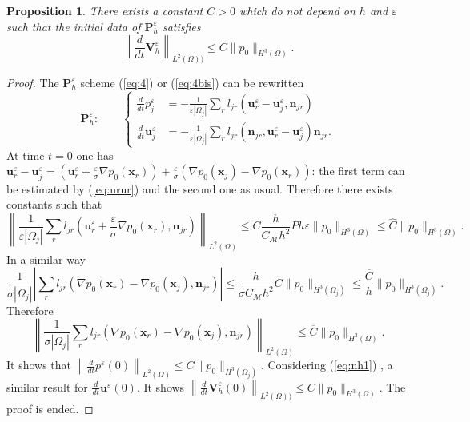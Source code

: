 \documentclass[a4paper,french,english,10pt]{article}
\newcommand\njr{\mathbf{n}_{jr}}
\newcommand\uu{\mathbf{u}}
\newcommand\eps{\varepsilon}
\newcommand\uj{\uu_j}
\newcommand\ur{\uu_r}
\newtheorem{proposition}[theorem]{Proposition}
\begin{document}
\begin{proposition}
There exists a constant $C>0$ which do not depend on $h$ and $\eps$ such that
the initial data of $\mathbf P_h^\eps$ satisfies
\begin{equation} \label{eq:nhnhnh1}
\left\|  \frac d{dt} \mathbf V_h^\eps \right\|_{L^2(\Omega))} 
 \leq C \|   p_0   \|_{H^3(\Omega)}.
\end{equation}
\end{proposition}
\begin{proof}
The $\mathbf P_h^\eps$ scheme (\ref{eq:4}) or (\ref{eq:4bis}) can be rewritten 
\begin{equation} \label{eq:nh1}
\mathbf P_h^\eps:
\qquad
\left\{ 
\begin{array}{ll}
\displaystyle
\frac{d}{dt} p_{j}^{\eps}&\displaystyle
 =  -\frac{1}{ \varepsilon |\Omega_{j} | }
\sum_{r}l_{jr}(\ur^{\eps}- \uj^\eps,\njr) \\
\displaystyle 
\frac{d}{dt}\uj^{\eps}& = - \frac{1}{\varepsilon  |
\Omega_{j}| }
\sum_{r}l_{jr} (\njr,\uu_r^{\eps} -\uu_j^{\eps})\njr.
\end{array}
\right.
\end{equation}
At time $t=0$ one has 
$
\ur^{\eps}- \uj^\eps= \left( \ur^{\eps} + \frac \eps \sigma \nabla p_0(\mathbf x_r) \right)
+ \frac\eps \sigma \left(   \nabla p_0(\mathbf x_j)- \nabla p_0(\mathbf x_r) \right)$:
the first term can be estimated by (\ref{eq:urur}) and the second one as usual.
Therefore there exists  constants such that
$$
\left\| \frac{1}{ \varepsilon |\Omega_{j} | }
\sum_{r}l_{jr}(\ur^{\eps} + \frac \eps \sigma \nabla p_0(\mathbf x_r)  ,\njr)  \right\|_{L^2(\Omega)}
\leq C \frac{h}{C_\mathcal M h^2}P h\eps \| p_0 \|_{H^3(\Omega)}\leq
\widehat C\| p_0 \|_{H^3(\Omega)}.
$$
In a similar way
$$
\frac{1}{ \sigma |\Omega_{j} | }
\left| 
\sum_{r}l_{jr}(   \nabla p_0(\mathbf x_r)- \nabla p_0(\mathbf x_j)   ,\njr)  \right|
\leq \frac{h}{\sigma C_\mathcal M h^2} \widetilde C \| p_0 \|_{H^3(\Omega_j)}\leq
\frac{ \overline C} h  \| p_0 \|_{H^3(\Omega_j)}.
$$
Therefore 
$$
\left\| \frac{1}{ \sigma |\Omega_{j} | }
\sum_{r}l_{jr}(   \nabla p_0(\mathbf x_r)- \nabla p_0(\mathbf x_j)   ,\njr)  \right\|_{L^2(\Omega)}
\leq { \overline C}  \| p_0 \|_{H^3(\Omega)}.
$$
It shows that $\left\|  \frac d{dt}p^\eps(0)  \right\|_{L^2(\Omega)} \leq C \| p_0 \|_{H^3(\Omega_j)}$.
Considering (\ref{eq:nh1}) , a similar result for $ \frac d{dt}\mathbf u^\eps(0)$.
It shows
$
\left\|  \frac d{dt} \mathbf V_h^\eps(0) \right\|_{L^2(\Omega))}  \leq C \|   p_0   \|_{H^3(\Omega)}$.
The proof is ended.  %
\end{proof}
\end{document}
